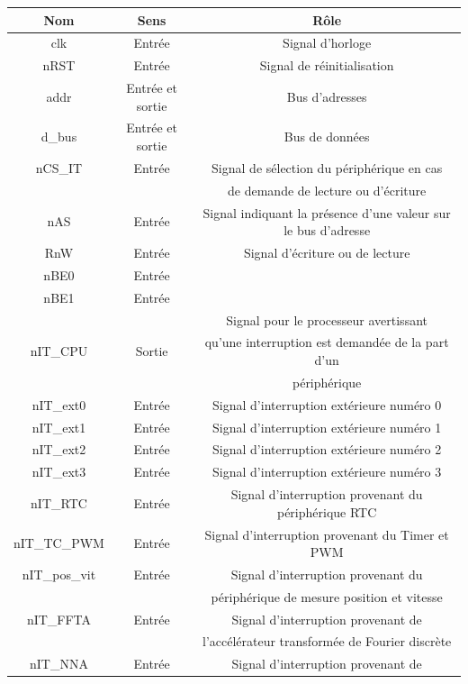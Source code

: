 \begin{table}[H]
	\centering
	\begin{tabular}{|c|c|c|}
		\hline
		Nom & Sens & Rôle\\
		\hline
		clk & Entrée & Signal d'horloge\\
		\hline
		nRST & Entrée & Signal de réinitialisation\\
		\hline
		addr & Entrée et sortie & Bus d'adresses\\
		\hline
		d\_bus & Entrée et sortie & Bus de données\\
		\hline
		nCS\_IT & Entrée & Signal de sélection du périphérique en cas \\
		& & de demande de lecture ou d'écriture\\
		\hline
		nAS & Entrée & Signal indiquant la présence d'une valeur sur le bus d'adresse\\
		\hline
		RnW & Entrée & Signal d'écriture ou de lecture\\
		\hline
		nBE0 & Entrée & \\
		\hline
		nBE1 & Entrée & \\
		\hline
		 &  & Signal pour le processeur avertissant \\
		nIT\_CPU & Sortie & qu'une interruption est demandée de la part d'un \\
		& & périphérique\\
		\hline
		nIT\_ext0 & Entrée & Signal d'interruption extérieure numéro 0\\
		\hline
		nIT\_ext1 & Entrée & Signal d'interruption extérieure numéro 1\\
		\hline
		nIT\_ext2 & Entrée & Signal d'interruption extérieure numéro 2\\
		\hline
		nIT\_ext3 & Entrée & Signal d'interruption extérieure numéro 3\\
		\hline
		nIT\_RTC & Entrée & Signal d'interruption provenant du périphérique RTC\\
		\hline
		nIT\_TC\_PWM & Entrée & Signal d'interruption provenant du Timer et PWM\\
		\hline
		nIT\_pos\_vit & Entrée & Signal d'interruption provenant du\\
		& & périphérique de mesure position et vitesse\\
		\hline
		nIT\_FFTA & Entrée & Signal d'interruption provenant de \\
		& & l'accélérateur transformée de Fourier discrète\\
		\hline
		nIT\_NNA & Entrée & Signal d'interruption provenant de \\

\end{tabular}
\end{table}

